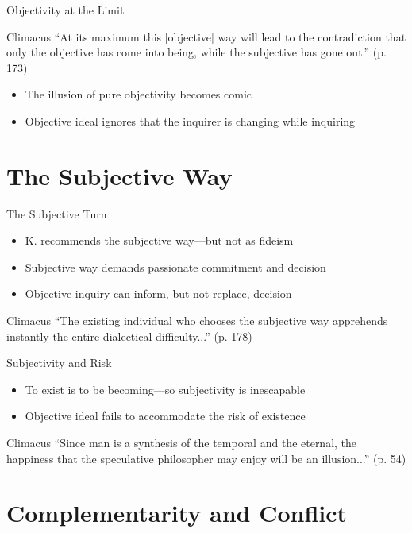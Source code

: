 \documentclass[12pt]{beamer}
\begin{document}
\begin{frame}{Objectivity at the Limit}
\begin{block}{Climacus}
  ``At its maximum this [objective] way will lead to the contradiction
  that only the objective has come into being, while the subjective
  has gone out.'' (p. 173)
\end{block}
\begin{itemize}
\item The illusion of pure objectivity becomes comic
\item Objective ideal ignores that the inquirer is changing while
  inquiring
\end{itemize}
\end{frame}


\section{The Subjective Way}

\begin{frame}{The Subjective Turn}
\begin{itemize}
  \item K. recommends the subjective way—but not as fideism
  \item Subjective way demands passionate commitment and decision
  \item Objective inquiry can inform, but not replace, decision
\end{itemize}
\begin{block}{Climacus}
“The existing individual who chooses the subjective way apprehends instantly the entire dialectical difficulty...” (p. 178)
\end{block}
\end{frame}

\begin{frame}{Subjectivity and Risk}
\begin{itemize}
  \item To exist is to be becoming—so subjectivity is inescapable
  \item Objective ideal fails to accommodate the risk of existence
\end{itemize}
\begin{block}{Climacus}
“Since man is a synthesis of the temporal and the eternal, the happiness that the speculative philosopher may enjoy will be an illusion...” (p. 54)
\end{block}
\end{frame}

\section{Complementarity and Conflict}
\end{document}
